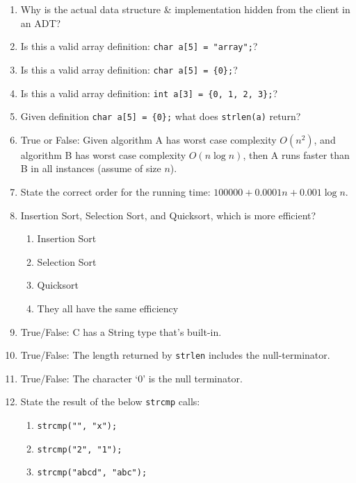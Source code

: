 \documentclass{article}
\begin{document}
\begin{enumerate}
    \item Why is the actual data structure \& implementation hidden from the client in an ADT?
    \vspace{16mm}
    \item Is this a valid array definition: \texttt{char a[5] = "array";}?
    \item Is this a valid array definition: \texttt{char a[5] = \{0\};}?
    \item Is this a valid array definition: \texttt{int a[3] = \{0, 1, 2, 3\};}?
    \item Given definition \texttt{char a[5] = \{0\};} what does \texttt{strlen(a)} return?
    \vspace{16mm}
    \item True or False: Given algorithm A has worst case complexity $O(n^2)$, and algorithm B has worst case complexity $O(n\log n)$, then A runs faster than B in all instances (assume of size $n$).
    \item State the correct order for the running time: $100000 + 0.0001n + 0.001\log n$.
    \vspace{16mm}
    \item Insertion Sort, Selection Sort, and Quicksort, which is more efficient?
    \begin{enumerate}[label=\alph*.]
        \item Insertion Sort
        \item Selection Sort
        \item Quicksort
        \item They all have the same efficiency
    \end{enumerate}
    \item True/False: C has a String type that’s built-in.
    \item True/False: The length returned by \texttt{strlen} includes the null-terminator.
    \item True/False: The character ‘0’ is the null terminator.
    \item State the result of the below \texttt{strcmp} calls:
    \begin{enumerate}[label=\alph*.]
        \item \texttt{strcmp("", "x");}
        \item \texttt{strcmp("2", "1");}
        \item \texttt{strcmp("abcd", "abc");}
    \end{enumerate}
    \vspace{16mm}


\end{enumerate}
\end{document}
